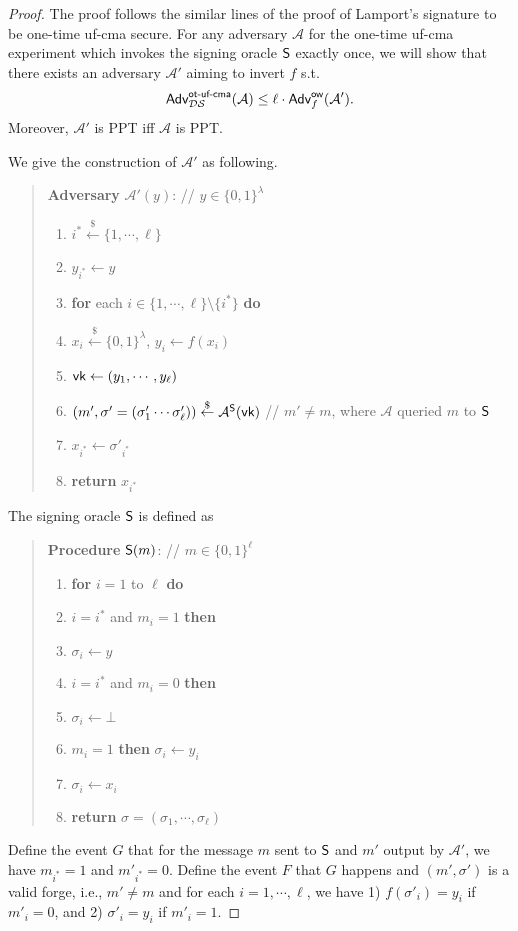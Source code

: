 \documentclass[12pt]{article}
\newcommand{\bits}{\{0,1\}}
\newcommand{\getsr}{\stackrel{\$}{\gets}}
\newcommand{\Adv}{\textsf{Adv}}
\newcommand{\tab}{\hspace{0.3in}}
\theoremstyle{definition}
\newcommand{\A}{\mathcal{A}}
\begin{document}
\begin{proof}
The proof follows the similar lines of the proof of Lamport's signature to be one-time uf-cma secure. For any adversary $\A$ for the one-time uf-cma experiment which invokes the signing oracle $\textsf{S}$ exactly once, we will show that there exists an adversary $\A'$ aiming to invert $f$ s.t. 
$$\Adv_{\DS}^{\textsf{ot-uf-cma}}(\A) \leq \ell\cdot\Adv_{f}^{\textsf{ow}}(\A').$$
Moreover, $\A'$ is PPT iff $\A$ is PPT. 

We give the construction of $\A'$ as following.
\begin{quote}
{\bf Adversary} $\A'(y)$: // $y\in\bits^\lambda$
\begin{enumerate}
\item $i^* \getsr \{1,\cdots,\ell\}$
\item $y_{i^*} \gets y$
\item {\bf for} each $i \in \{1,\cdots,\ell\}\setminus\{i^*\}$ {\bf do}
\item \tab $x_i \getsr \bits^\lambda$, $y_i \gets f(x_i)$
\item $\textsf{vk} \gets (y_1, \cdots, y_{\ell})$
\item $(m', \sigma'=(\sigma'_1\cdots\sigma'_{\ell}))\getsr \A^{\SO}(\vk)$ // $m'\not=m$, where $\A$ queried $m$ to $\textsf{S}$
\item $x_{i^*} \gets \sigma'_{i^*}$
\item {\bf return} $x_{i^*}$
\end{enumerate}
\end{quote}
The signing oracle $\textsf{S}$ is defined as
\begin{quote}
{\bf Procedure} $\textsf{S}(m)$: // $m\in\bits^\ell$
\begin{enumerate}
\item {\bf for} $i=1$ to $\ell$ {\bf do}
\item \tab {\bf if} $i = i^*$ and $m_i=1$ {\bf then}
\item \tab \tab $\sigma_{i} \gets y$
\item \tab {\bf else if} $i=i^*$ and $m_i=0$ {\bf then}
\item \tab \tab $\sigma_{i} \gets \bot$
\item \tab {\bf else if} $m_i=1$ {\bf then} $\sigma_i \gets y_i$
\item \tab {\bf else} $\sigma_i \gets x_i$
\item {\bf return} $\sigma = (\sigma_1, \cdots, \sigma_{\ell})$
\end{enumerate}
\end{quote}
Define the event $G$ that for the message $m$ sent to $\textsf{S}$ and $m'$ output by $\A'$, we have $m_{i^*} = 1$ and $m'_{i^*} = 0$. Define the event $F$ that $G$ happens and $(m',\sigma')$ is a valid forge, i.e., $m'\not=m$ and for each $i=1,\cdots,\ell$, we have 1) $f(\sigma'_i)=y_i$ if $m'_i=0$, and 2) $\sigma'_i=y_i$ if $m'_i=1$.


\end{proof}
\end{document}
